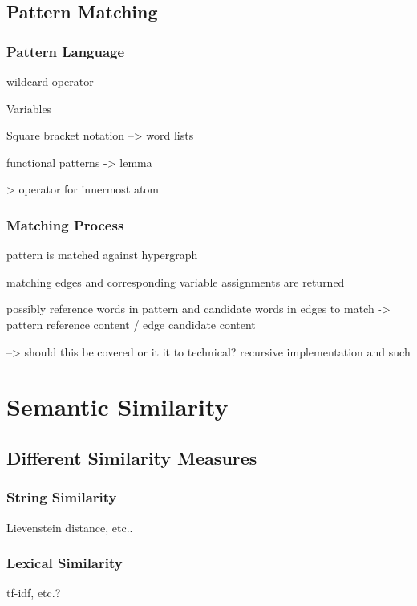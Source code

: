 \documentclass[11pt]{scrreprt}
\begin{document}
\subsection{Pattern Matching}

\subsubsection{Pattern Language}
\label{sec:sh-pattern-language}

wildcard operator

Variables

Square bracket notation --> word lists

functional patterns -> lemma

> operator for innermost atom


\subsubsection{Matching Process}
\label{sec:pattern-matching-process}

pattern is matched against hypergraph

matching edges and corresponding variable assignments are returned

possibly reference words in pattern and candidate words in edges to match
-> pattern reference content / edge candidate content


--> should this be covered or it it to technical? recursive implementation and such



\section{Semantic Similarity}

\subsection{Different Similarity Measures}

\subsubsection{String Similarity}
Lievenstein distance, etc..

\subsubsection{Lexical Similarity}
tf-idf, etc.?
\end{document}

